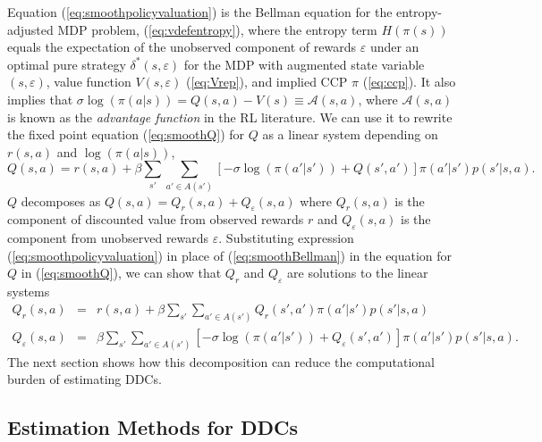 Equation (\ref{eq:smoothpolicyvaluation}) is  the Bellman equation for the entropy-adjusted MDP problem, (\ref{eq:vdefentropy}), where
the entropy term $H(\pi(s))$ equals  the expectation of the unobserved component of rewards $\varepsilon$ under an optimal pure strategy
$\delta^*(s,\varepsilon)$ for the MDP with augmented state variable $(s,\varepsilon)$, value function $V(s,\varepsilon)$ (\ref{eq:Vrep}), 
and implied CCP $\pi$ (\ref{eq:ccp}). It also implies that $\sigma\log(\pi(a|s))=Q(s,a)-V(s)\equiv \mathcal{A}(s,a)$, where
$\mathcal{A}(s,a)$ is known as the {\it advantage function\/} in the RL literature. We can use it to rewrite the fixed point
equation (\ref{eq:smoothQ}) for $Q$ as a linear system depending on $r(s,a)$ and $\log(\pi(a|s))$,
\begin{equation}
    Q(s,a) = r(s,a) + \beta \sum_{s'} \sum_{a' \in A(s')} \left[ -\sigma\log(\pi(a'|s'))+Q(s',a')\right]\pi(a'|s')p(s'|s,a).
\label{eq:linq}
\end{equation}
$Q$ decomposes as $Q(s,a)=Q_r(s,a)+Q_\varepsilon(s,a)$ where $Q_r(s,a)$ is the component 
of discounted value from observed rewards $r$ and $Q_\varepsilon(s,a)$ is the component from unobserved rewards $\varepsilon$.
Substituting expression (\ref{eq:smoothpolicyvaluation}) in place of (\ref{eq:smoothBellman}) in the equation for
$Q$ in (\ref{eq:smoothQ}), we can show that $Q_r$ and $Q_\varepsilon$ are solutions to the linear systems
\begin{eqnarray}
     Q_r(s,a)&=&r(s,a)+\beta \sum_{s'} \sum_{a' \in A(s')} Q_r(s',a')\pi(a'|s')p(s'|s,a) \label{eq:Qr} \\
     Q_\varepsilon(s,a)&=&\beta \sum_{s'} \sum_{a' \in A(s')}\left[-\sigma\log(\pi(a'|s'))+ Q_\varepsilon(s',a')\right]\pi(a'|s')p(s'|s,a).
\label{eq:Qeps}
\end{eqnarray}
The next section shows how this decomposition can reduce the computational burden of estimating DDCs.

\subsection{Estimation Methods for DDCs}
\label{section:ddc_methods}

